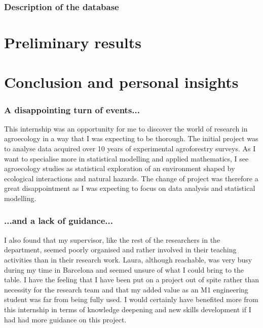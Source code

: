 \documentclass{article}
\begin{document}
\subsubsection{Description of the database}


\section{Preliminary results}


\section{Conclusion and personal insights}
\subsubsection{A disappointing turn of events...}
This internship was an opportunity for me to discover the world of research in
agroecology in a way that I was expecting to be thorough. The initial
project was to analyse data acquired over 10 years of experimental agroforestry
surveys. As I want to specialise more in statistical modelling and applied
mathematics, I see agroecology studies as statistical exploration of an
environment shaped by ecological interactions and natural hazards. The change
of project was therefore a great disappointment as I was expecting to focus on
data analysis and statistical modelling.

\subsubsection{...and a lack of guidance...}
I also found that my supervisor, like the rest of the researchers in the
department, seemed poorly organised and rather involved in their teaching
activities than in their research work. Laura, although reachable, was very
busy during my time in Barcelona and seemed unsure of what I could bring to the
table. I have the feeling that I have been put on a project out of spite rather
than necessity for the research team and that my added
value as an M1 engineering student was far from being fully used.
I would certainly have benefited more from this internship in terms of
knowledge deepening and new skills development if I had had more guidance on
this project.
\end{document}
